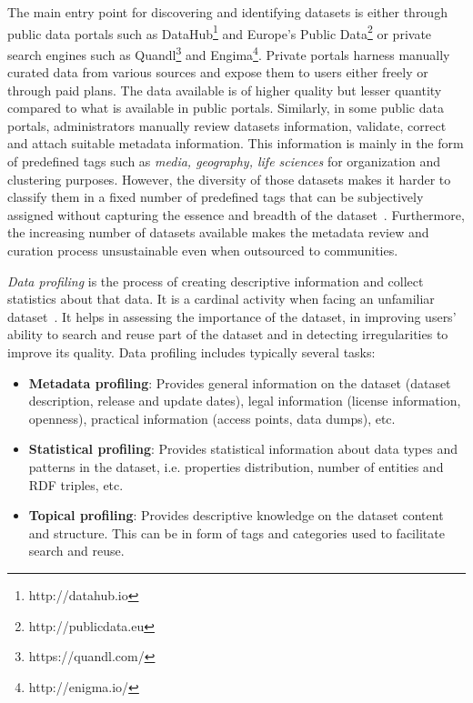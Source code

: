\documentclass[runningheads,a4paper]{llncs}
\begin{document}
The main entry point for discovering and identifying datasets is either through public data portals such as DataHub\footnote{http://datahub.io} and Europe's Public Data\footnote{http://publicdata.eu} or private search engines such as Quandl\footnote{https://quandl.com/} and Engima\footnote{http://enigma.io/}. Private portals harness manually curated data from various sources and expose them to users either freely or through paid plans. The data available is of higher quality but lesser quantity compared to what is available in public portals. Similarly, in some public data portals, administrators manually review datasets information, validate, correct and attach suitable metadata information. This information is mainly in the form of predefined tags such as \textit{media, geography, life sciences} for organization and clustering purposes. However, the diversity of those datasets makes it harder to classify them in a fixed number of predefined tags that can be subjectively assigned without capturing the essence and breadth of the dataset~\cite{6690016}. Furthermore, the increasing number of datasets available makes the metadata review and curation process unsustainable even when outsourced to communities.

\textit{Data profiling} is the process of creating descriptive information and collect statistics about that data. It is a cardinal activity when facing an unfamiliar dataset~\cite{semwebprofiling}. It helps in assessing the importance of the dataset, in improving users' ability to search and reuse part of the dataset and in detecting irregularities to improve its quality. Data profiling includes typically several tasks:
\begin{itemize}
  \item \textbf{Metadata profiling}: Provides general information on the dataset (dataset description, release and update dates), legal information (license information, openness), practical information (access points, data dumps), etc.
  \item \textbf{Statistical profiling}: Provides statistical information about data types and patterns in the dataset, i.e. properties distribution, number of entities and RDF triples, etc.
  \item \textbf{Topical profiling}: Provides descriptive knowledge on the dataset content and structure. This can be in form of tags and categories used to facilitate search and reuse.
\end{itemize}
\end{document}
